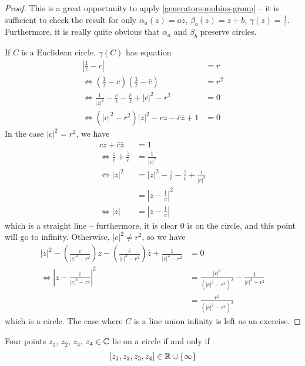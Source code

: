 \documentclass{../../template/note}
\begin{document}
    \begin{proof}
        This is a great opportunity to apply \cref{generators-mobius-group} -- it is sufficient to check the result for only \(\alpha_a(z) = az\), \(\beta_b(z) = z + b\), \(\gamma(z) = \frac{1}{z}\). Furthermore, it is really quite obvious that \(\alpha_a\) and \(\beta_b\) preserve circles.

        If \(C\) is a Euclidean circle, \(\gamma(C)\) has equation
        \begin{align*}
            \left|\frac{1}{z} - c\right| &= r \\
            \iff \left(\frac{1}{z} - c\right)\left(\frac{1}{\bar z} - \bar c\right) &= r^2 \\
            \iff \frac{1}{|z|^2} - \frac{c}{\bar z} - \frac{\bar c}{z} + |c|^2 - r^2 &= 0 \\
            \iff (|c|^2 - r^2)|z|^2 - cz - \bar c \bar z + 1 &= 0
        \end{align*}
        In the case \(|c|^2 = r^2\), we have
        \begin{align*}
            cz + \bar c \bar z &= 1 \\
            \iff \frac{z}{\bar c} + \frac{\bar z}{c} &= \frac{1}{|c|^2} \\
            \iff |z|^2 &= |z|^2 - \frac{z}{\bar c} - \frac{\bar z}{c} + \frac{1}{|c|^2} \\
            &= \left|z-\frac{1}{c}\right|^2 \\
            \iff |z| &= \left|z - \frac{1}{c}\right|
        \end{align*}
        which is a straight line -- furthermore, it is clear 0 is on the circle, and this point will go to infinity. Otherwise, \(|c|^2 \neq r^2\), so we have
        \begin{align*}
            |z|^2 - \left(\frac{c}{|c|^2 - r^2}\right)z - \left(\frac{\bar c}{|c|^2 - r^2}\right) \bar z + \frac{1}{|c|^2 - r^2} &= 0 \\
            \iff \left|z - \frac{\bar c}{|c|^2 - r^2}\right|^2 &= \frac{|c|^2}{(|c|^2 - r^2)^2} - \frac{1}{|c|^2 - r^2} \\
            &= \frac{r^2}{(|c|^2 - r^2)^2}
        \end{align*}
        which is a circle. The case where \(C\) is a line union infinity is left as an exercise.        
    \end{proof}
    
    \begin{corollary}
        Four points \(z_1\), \(z_2\), \(z_3\), \(z_4 \in \mathbb C\) lie on a circle if and only if
        \[
            [z_1, z_2, z_3, z_4] \in \mathbb R \cup \{\infty\}
        \]
    \end{corollary}
    
\end{document}
